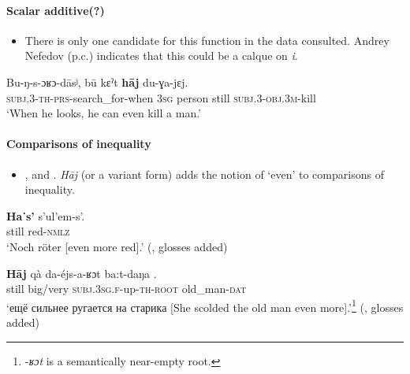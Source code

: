 \paragraph{Scalar additive(?)}\label{appendixKetScalarAdditive}
\begin{itemize}
	\item There is only one candidate for this function in the data consulted. Andrey Nefedov (p.c.) indicates that this could be a calque on  \textit{i}.
\end{itemize}

\begin{exe}
	\ex \gll Bu-ŋ-s-ɔʁɔ-dāsʲ, bū kɛˀt \textbf{hāj} du-ɣa-jɛj.\\
	\textsc{subj}.3-\textsc{th}-\textsc{prs}-search\_for-when 3\textsc{sg} person still \textsc{subj}.3-\textsc{obj}.3\textsc{m}-kill\\
	\glt \lq When he looks, he can even kill a man.' \parencite[173]{Nefedov2015}
\end{exe}


\paragraph{Comparisons of inequality}\label{appendixKetComparisons}
\begin{itemize}
	\item \textcite[138]{Georg2007}, \textcite[177]{KotorovaNefedov2015} and \textcite[124]{Werner1997}.
	\textit{Hāj} (or a variant form) adds the notion of \lq even\rq{ }to comparisons of inequality.
\end{itemize}
\begin{exe}
	\ex
	\gll \textbf{Ha˙s’} s’ul’em-s’.\\
	still red-\textsc{nmlz}\\
	\glt \lq Noch röter [even more red].' (\cite[124]{Werner1997}, glosses added)
	
	\ex
	\gll \textbf{Hāj} qà da-éjs-a-ʁɔt ba:t-daŋa .\\
	still big/very \textsc{subj}.3\textsc{sg}.\textsc{f}-up-\textsc{th}-\textsc{root} old\_man-\textsc{dat}\\
	\glt \lq ещё сильнее ругается на старика [She scolded the old man even more].'\footnote{-\textit{ʁɔt} is a semantically near-empty root.} (\cite[177]{KotorovaNefedov2015}, glosses added)
\end{exe}

